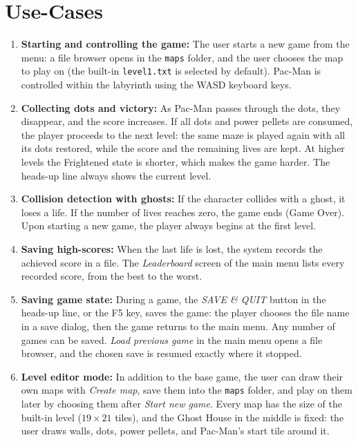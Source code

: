 \documentclass[11pt, a4paper]{article}
\begin{document}
\section{Use-Cases}
\begin{enumerate}
    \item \textbf{Starting and controlling the game:} The user starts a new game from the menu: a file browser opens in the \texttt{maps} folder, and the user chooses the map to play on (the built-in \texttt{level1.txt} is selected by default). Pac-Man is controlled within the labyrinth using the WASD keyboard keys.
    \item \textbf{Collecting dots and victory:} As Pac-Man passes through the dots, they disappear, and the score increases. If all dots and power pellets are consumed, the player proceeds to the next level: the same maze is played again with all its dots restored, while the score and the remaining lives are kept. At higher levels the Frightened state is shorter, which makes the game harder. The heads-up line always shows the current level.
    \item \textbf{Collision detection with ghosts:} If the character collides with a ghost, it loses a life. If the number of lives reaches zero, the game ends (Game Over). Upon starting a new game, the player always begins at the first level.
    \item \textbf{Saving high-scores:} When the last life is lost, the system records the achieved score in a file. The \textit{Leaderboard} screen of the main menu lists every recorded score, from the best to the worst.
    \item \textbf{Saving game state:} During a game, the \textit{SAVE \& QUIT} button in the heads-up line, or the F5 key, saves the game: the player chooses the file name in a save dialog, then the game returns to the main menu. Any number of games can be saved. \textit{Load previous game} in the main menu opens a file browser, and the chosen save is resumed exactly where it stopped.
    \item \textbf{Level editor mode:} In addition to the base game, the user can draw their own maps with \textit{Create map}, save them into the \texttt{maps} folder, and play on them later by choosing them after \textit{Start new game}. Every map has the size of the built-in level ($19 \times 21$ tiles), and the Ghost House in the middle is fixed: the user draws walls, dots, power pellets, and Pac-Man's start tile around it.
\end{enumerate}
\end{document}
